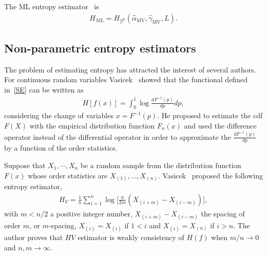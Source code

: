 \documentclass[journal]{IEEEtran}
\begin{document}
	The ML entropy estimator~\cite{CaseBerg01} is
	\begin{align}
		H_{ML}=H_{\mathcal G^0}(\widehat{\alpha}_{\text{MV}},\widehat{\gamma}_{\text{MV}},L).
	\end{align}
	
	
	
	
	\subsection{Non-parametric entropy estimators}
	\label{Hest}
	
	The problem of estimating entropy has attracted the interest of several authors. For continuous random variables Vasicek~\cite{Vasicek76} showed that the functional defined in~\eqref{SE} can be written as
	\begin{align}
	H[f(x)]=\int_{0}^{1} \log \frac{d F^{-1}(p)}{d p} d p,
	\end{align}
	considering the change of variables $x=F^{-1}(p).$
	He proposed to estimate the cdf $F(X)$ with the empirical distribution function $F_n(x)$ and used the difference operator instead of the differential operator in order to approximate the $\frac{d F^{-1}(p)}{d p}$ by a function of the order statistics.
	
	Suppose that $X_1,\cdots,X_n$ be a random sample from the distribution function $F(x)$ whose order statistics are $X_{(1)}, \ldots, X_{(n)}$. Vasicek~\cite{Vasicek76} proposed the following entropy estimator,
	\begin{align}
	\label{HV}
		H_{V}=\frac{1}{n} \sum_{i=1}^{n} \log \Big[\frac{n}{2 m}\left(X_{(i+m)}-X_{(i-m)}\right)\Big], 
	\end{align}
	with $m<n/2$ a positive integer number, $X_{(i+m)}-X_{(i-m)}$ the spacing of order $m$, or $m$-spacing, $X_{(i)}=X_{(i)}$ if $1<i$ and $X_{(i)}=X_{(n)}$ if $i>n$.
	The author proves that $HV$ estimator is weakly consistency of $H(f)$ when $m/n \to 0$ and $n,m \to \infty$.
	
\end{document}
